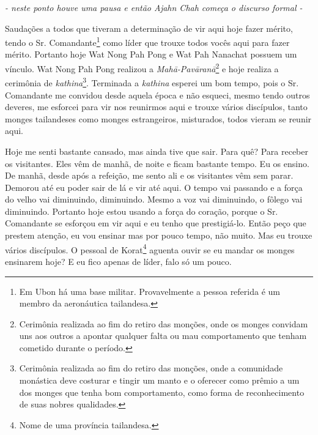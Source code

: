 {\itshape
{}- neste ponto houve uma pausa e então Ajahn Chah começa o discurso
formal -}

Saudações a todos que tiveram a determinação de vir aqui hoje fazer
mérito, tendo o Sr. Comandante\footnote{Em Ubon há uma base militar.
Provavelmente a pessoa referida é um membro da aeronáutica tailandesa.
} como líder que trouxe todos vocês aqui para fazer mérito. Portanto
hoje Wat Nong Pah Pong e Wat Pah Nanachat possuem um vínculo. Wat Nong
Pah Pong realizou a \textit{Mah\=a-Pav\=aran\=a}\footnote{Cerimônia
realizada ao fim do retiro das monções, onde os monges convidam uns aos
outros a apontar qualquer falta ou mau comportamento que tenham
cometido durante o período.} e hoje realiza a cerimônia de
\textit{kathina}\footnote{Cerimônia realizada ao fim do retiro das
monções, onde a comunidade monástica deve costurar e tingir um manto e
o oferecer como prêmio a um dos monges que tenha bom comportamento,
como forma de reconhecimento de suas nobres qualidades.}. Terminada a
\textit{kathina} esperei um bom tempo, pois o Sr. Comandante me
convidou desde aquela época e não esqueci, mesmo tendo outros deveres,
me esforcei para vir nos reunirmos aqui e trouxe vários discípulos,
tanto monges tailandeses como monges estrangeiros, misturados, todos
vieram se reunir aqui. 

Hoje me senti bastante cansado, mas ainda tive que sair. Para quê?
Para receber os visitantes. Eles vêm de manhã, de noite e ficam
bastante tempo. Eu os ensino. De manhã, desde após a refeição, me sento
ali e os visitantes vêm sem parar. Demorou até eu poder sair de lá e
vir até aqui. O tempo vai passando e a força do velho vai diminuindo,
diminuindo. Mesmo a voz vai diminuindo, o fôlego vai diminuindo.
Portanto hoje estou usando a força do coração, porque o Sr. Comandante
se esforçou em vir aqui e eu tenho que prestigiá-lo. Então peço que
prestem atenção, eu vou ensinar mas por pouco tempo, não muito. Mas eu
trouxe vários discípulos. O pessoal de Korat\footnote{Nome de uma
província tailandesa.} aguenta ouvir se eu mandar os monges ensinarem
hoje? E eu fico apenas de líder, falo só um pouco. 

